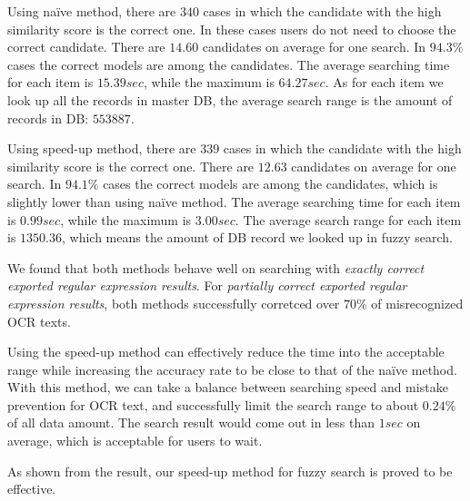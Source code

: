 \documentclass[technicalreport]{ieicej}
\begin{document}
        Using naïve method, there are $340$ cases in which the candidate with the high similarity score is the correct one. In these cases users do not need to choose the correct candidate. There are $14.60$ candidates on average for one search. In $94.3\%$ cases the correct models are among the candidates. The average searching time for each item is $15.39sec$, while the maximum is $64.27sec$. As for each item we look up all the records in master DB, the average search range is the amount of records in DB: $553887$.
        
        Using speed-up method, there are $339$ cases in which the candidate with the high similarity score is the correct one. There are $12.63$ candidates on average for one search. In $94.1\%$ cases the correct models are among the candidates, which is slightly lower than using naïve method. The average searching time for each item is $0.99sec$, while the maximum is $3.00sec$. The average search range for each item is $1350.36$, which means the amount of DB record we looked up in fuzzy search.

        We found that both methods behave well on searching with {\em exactly correct exported regular expression results}. For {\em partially correct exported regular expression results}, both methods successfully corretced over $70\%$ of misrecognized OCR texts.

        Using the speed-up method can effectively reduce the time into the acceptable range while increasing the accuracy rate to be close to that of the naïve method. With this method, we can take a balance between searching speed and mistake prevention for OCR text, and successfully limit the search range to about $0.24\%$ of all data amount. The search result would come out in less than $1sec$ on average, which is acceptable for users to wait.
        
        As shown from the result, our speed-up method for fuzzy search is proved to be effective.
\end{document}
